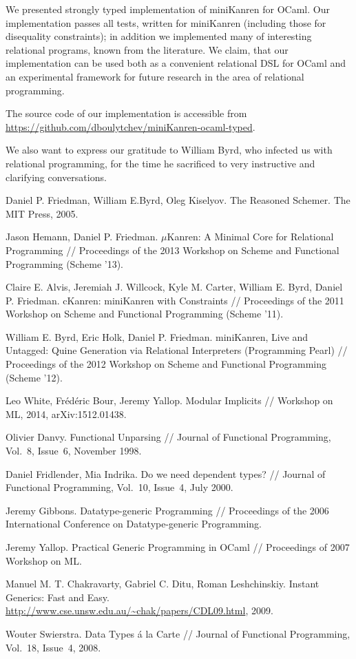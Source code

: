 \documentclass[10pt, oneside, nocopyrightspace]{sigplanconf}
\begin{document}
We presented strongly typed implementation of miniKanren for OCaml. Our implementation
passes all tests, written for miniKanren (including those for disequality constraints);
in addition we implemented many of interesting relational programs, known from
the literature. We claim, that our implementation can be used both as a convenient
relational DSL for OCaml and an experimental framework for future research in the area of
relational programming. 

The source code of our implementation is accessible from \url{https://github.com/dboulytchev/miniKanren-ocaml-typed}.

We also want to express our gratitude to William Byrd, who infected us with relational programming, for 
the time he sacrificed to very instructive and clarifying conversations.

\begin{thebibliography}{99}
Daniel P. Friedman, William E.Byrd, Oleg Kiselyov. The Reasoned Schemer. The MIT
Press, 2005.

Jason Hemann, Daniel P. Friedman. $\mu$Kanren: A Minimal Core for Relational Programming //
Proceedings of the 2013 Workshop on Scheme and Functional Programming (Scheme '13).

Claire E. Alvis, Jeremiah J. Willcock, Kyle M. Carter, William E. Byrd, Daniel P. Friedman.
cKanren: miniKanren with Constraints // 
Proceedings of the 2011 Workshop on Scheme and Functional Programming (Scheme '11).

William E. Byrd, Eric Holk, Daniel P. Friedman.
miniKanren, Live and Untagged: Quine Generation via Relational Interpreters (Programming Pearl) //
Proceedings of the 2012 Workshop on Scheme and Functional Programming (Scheme '12).

Leo White, Fr\'ed\'eric Bour, Jeremy Yallop. 
Modular Implicits // Workshop on ML, 2014, arXiv:1512.01438.

Olivier Danvy.
Functional Unparsing // Journal of Functional Programming, Vol.~8, Issue~6, November 1998.

Daniel Fridlender, Mia Indrika.
Do we need dependent types? // Journal of Functional Programming, Vol.~10, Issue~4, July 2000.

Jeremy Gibbons. Datatype-generic Programming //
Proceedings of the 2006 International Conference on Datatype-generic Programming.

Jeremy Yallop. 
Practical Generic Programming in OCaml // Proceedings of 2007 Workshop on ML.

Manuel M. T. Chakravarty, Gabriel C. Ditu, Roman Leshchinskiy. 
Instant Generics: Fast and Easy. \url{http://www.cse.unsw.edu.au/~chak/papers/CDL09.html}, 2009.

Wouter Swierstra. Data Types \'a la Carte  // Journal of Functional Programming, Vol.~18, Issue~4, 2008.
\end{thebibliography}
\end{document}
